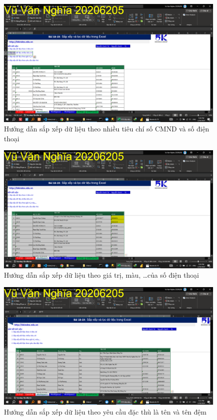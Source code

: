 \documentclass{article}
\begin{document}
\begin{figure}[H]
\centering
\includegraphics[scale = 0.15]{Video2/HuongDan/1.png}
\caption{Hướng dẫn sắp xếp dữ liệu theo nhiều tiêu chí số CMND và số điện thoại}
\end{figure}

\begin{figure}[H]
\centering
\includegraphics[scale = 0.15]{Video2/HuongDan/2.png}
\caption{Hướng dẫn sắp xếp dữ liệu theo giá trị, màu, \dots của số điện thoại}
\end{figure}

\begin{figure}[H]
\centering
\includegraphics[scale = 0.15]{Video2/HuongDan/3.png}
\caption{Hướng dẫn sắp xếp dữ liệu theo yêu cầu đặc thù là tên và tên đệm}
\end{figure}
\end{document}
